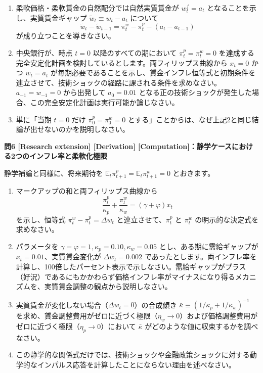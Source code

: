 \documentclass[
  japanese,
  lualatex,
  ja=standard,
  12pt,
  a4paper]{ltjsarticle}
\providecommand{\tightlist}{%
  \setlength{\itemsep}{0pt}\setlength{\parskip}{0pt}}
\begin{document}
\begin{enumerate}
\def\labelenumi{\arabic{enumi}.}
\tightlist
\item
  柔軟価格・柔軟賃金の自然配分では自然実質賃金が \(w_t^f=a_t\)
  となることを示し、実質賃金ギャップ \(\widetilde w_t\equiv w_t-a_t\)
  について \[
  \widetilde w_t-\widetilde w_{t-1}
  =\pi_t^w-\pi_t^p-(a_t-a_{t-1})
  \] が成り立つことを導きなさい。
\item
  中央銀行が、時点 \(t=0\) 以降のすべての期において
  \(\pi_t^p=\pi_t^w=0\)
  を達成する完全安定化計画を検討しているとします。両フィリップス曲線から
  \(x_t=0\) かつ \(w_t=a_t\)
  が毎期必要であることを示し、賃金インフレ恒等式と初期条件を連立させて、技術ショックの経路に課される条件を求めなさい。\(a_{-1}=w_{-1}=0\)
  から出発して \(a_0=0.01\)
  となる正の技術ショックが発生した場合、この完全安定化計画は実行可能か論じなさい。
\item
  単に「当期 \(t=0\) だけ \(\pi_0^p=\pi_0^w=0\)
  とする」ことからは、なぜ上記2と同じ結論が出せないのかを説明しなさい。
\end{enumerate}


\textbf{問6 {[}Research extension{]} {[}Derivation{]}
{[}Computation{]}：静学ケースにおける2つのインフレ率と柔軟化極限}

静学補論と同様に、将来期待を
\(\mathbb{E}_t\pi_{t+1}^p=\mathbb{E}_t\pi_{t+1}^w=0\) とおきます。

\begin{enumerate}
\def\labelenumi{\arabic{enumi}.}
\tightlist
\item
  マークアップの和と両フィリップス曲線から \[
  \frac{\pi_t^p}{\kappa_p}+\frac{\pi_t^w}{\kappa_w}
  =(\gamma+\varphi)x_t
  \] を示し、恒等式 \(\pi_t^w-\pi_t^p=\Delta w_t\)
  と連立させて、\(\pi_t^p\) と \(\pi_t^w\)
  の明示的な決定式を求めなさい。
\item
  パラメータを \(\gamma=\varphi=1, \kappa_p=0.10, \kappa_w=0.05\)
  とし、ある期に需給ギャップが \(x_t=0.01\)、実質賃金変化が
  \(\Delta w_t=0.002\)
  であったとします。両インフレ率を計算し、100倍したパーセント表示で示しなさい。需給ギャップがプラス（好況）であるにもかかわらず価格インフレ率がマイナスになり得るメカニズムを、実質賃金調整の観点から説明しなさい。
\item
  実質賃金が変化しない場合（\(\Delta w_t=0\)）の合成傾き
  \(\bar\kappa \equiv (1/\kappa_p + 1/\kappa_w)^{-1}\)
  を求め、賃金調整費用がゼロに近づく極限（\(\eta_w\to0\)）および価格調整費用がゼロに近づく極限（\(\eta_p\to0\)）において
  \(\bar\kappa\) がどのような値に収束するかを調べなさい。
\item
  この静学的な関係式だけでは、技術ショックや金融政策ショックに対する動学的なインパルス応答を計算したことにならない理由を述べなさい。
\end{enumerate}
\end{document}
